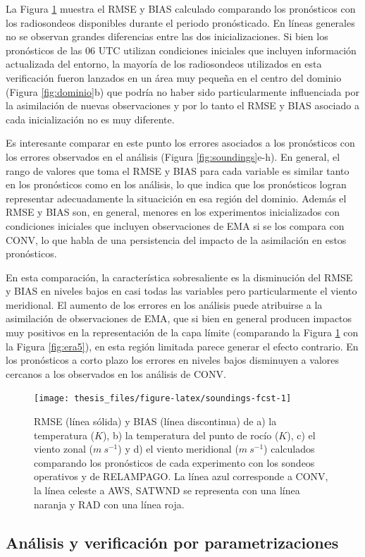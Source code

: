 \documentclass[12pt,oneside,a4paper]{reedthesis}
\begin{document}
La Figura \ref{fig:soundings-fcst} muestra el RMSE y BIAS calculado comparando los pronósticos con los radiosondeos disponibles durante el periodo pronósticado. En líneas generales no se observan grandes diferencias entre las dos inicializaciones. Si bien los pronósticos de las 06 UTC utilizan condiciones iniciales que incluyen información actualizada del entorno, la mayoría de los radiosondeos utilizados en esta verificación fueron lanzados en un área muy pequeña en el centro del dominio (Figura \ref{fig:dominio}b) que podría no haber sido particularmente influenciada por la asimilación de nuevas observaciones y por lo tanto el RMSE y BIAS asociado a cada inicialización no es muy diferente.

Es interesante comparar en este punto los errores asociados a los pronósticos con los errores observados en el análisis (Figura \ref{fig:soundings}e-h). En general, el rango de valores que toma el RMSE y BIAS para cada variable es similar tanto en los pronósticos como en los análisis, lo que indica que los pronósticos logran representar adecuadamente la situacición en esa región del dominio. Además el RMSE y BIAS son, en general, menores en los experimentos inicializados con condiciones iniciales que incluyen observaciones de EMA si se los compara con CONV, lo que habla de una persistencia del impacto de la asimilación en estos pronósticos.

En esta comparación, la característica sobresaliente es la disminución del RMSE y BIAS en niveles bajos en casi todas las variables pero particularmente el viento meridional. El aumento de los errores en los análisis puede atribuirse a la asimilación de observaciones de EMA, que si bien en general producen impactos muy positivos en la representación de la capa límite (comparando la Figura \ref{fig:soundings-fcst} con la Figura \ref{fig:era5}), en esta región limitada parece generar el efecto contrario. En los pronósticos a corto plazo los errores en niveles bajos disminuyen a valores cercanos a los observados en los análisis de CONV.


\begin{figure}

{\centering \texttt{[image: thesis\_files/figure-latex/soundings-fcst-1]} 

}

\caption{RMSE (línea sólida) y BIAS (línea discontinua) de a) la temperatura (\(K\)), b) la temperatura del punto de rocío (\(K\)), c) el viento zonal (\(m\ s^{-1}\)) y d) el viento meridional (\(m\ s^{-1}\)) calculados comparando los pronósticos de cada experimento con los sondeos operativos y de RELAMPAGO. La línea azul corresponde a CONV, la línea celeste a AWS, SATWND se representa con una línea naranja y RAD con una línea roja.}\label{fig:soundings-fcst}
\end{figure}
\hypertarget{anuxe1lisis-y-verificaciuxf3n-por-parametrizaciones}{%
\subsection{Análisis y verificación por parametrizaciones}\label{anuxe1lisis-y-verificaciuxf3n-por-parametrizaciones}}
\end{document}
